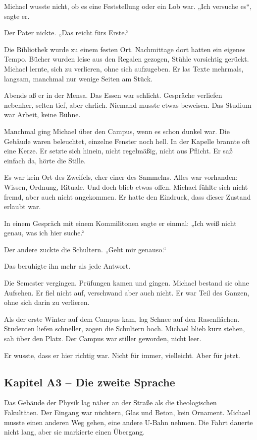 \documentclass[
]{article}
\begin{document}
Michael wusste nicht, ob es eine Feststellung oder ein Lob war. „Ich versuche es``, sagte er.

Der Pater nickte. „Das reicht fürs Erste.``

Die Bibliothek wurde zu einem festen Ort. Nachmittage dort hatten ein eigenes Tempo. Bücher wurden leise aus den Regalen gezogen, Stühle vorsichtig gerückt. Michael lernte, sich zu verlieren, ohne sich aufzugeben. Er las Texte mehrmals, langsam, manchmal nur wenige Seiten am Stück.

Abends aß er in der Mensa. Das Essen war schlicht. Gespräche verliefen nebenher, selten tief, aber ehrlich. Niemand musste etwas beweisen. Das Studium war Arbeit, keine Bühne.

Manchmal ging Michael über den Campus, wenn es schon dunkel war. Die Gebäude waren beleuchtet, einzelne Fenster noch hell. In der Kapelle brannte oft eine Kerze. Er setzte sich hinein, nicht regelmäßig, nicht aus Pflicht. Er saß einfach da, hörte die Stille.

Es war kein Ort des Zweifels, eher einer des Sammelns. Alles war vorhanden: Wissen, Ordnung, Rituale. Und doch blieb etwas offen. Michael fühlte sich nicht fremd, aber auch nicht angekommen. Er hatte den Eindruck, dass dieser Zustand erlaubt war.

In einem Gespräch mit einem Kommilitonen sagte er einmal: „Ich weiß nicht genau, was ich hier suche.``

Der andere zuckte die Schultern. „Geht mir genauso.``

Das beruhigte ihn mehr als jede Antwort.

Die Semester vergingen. Prüfungen kamen und gingen. Michael bestand sie ohne Aufsehen. Er fiel nicht auf, verschwand aber auch nicht. Er war Teil des Ganzen, ohne sich darin zu verlieren.

Als der erste Winter auf dem Campus kam, lag Schnee auf den Rasenflächen. Studenten liefen schneller, zogen die Schultern hoch. Michael blieb kurz stehen, sah über den Platz. Der Campus war stiller geworden, nicht leer.

Er wusste, dass er hier richtig war. Nicht für immer, vielleicht. Aber für jetzt.

\subsection{Kapitel A3 -- Die zweite Sprache}\label{kapitel-a3-die-zweite-sprache}

Das Gebäude der Physik lag näher an der Straße als die theologischen Fakultäten. Der Eingang war nüchtern, Glas und Beton, kein Ornament. Michael musste einen anderen Weg gehen, eine andere U-Bahn nehmen. Die Fahrt dauerte nicht lang, aber sie markierte einen Übergang.
\end{document}
